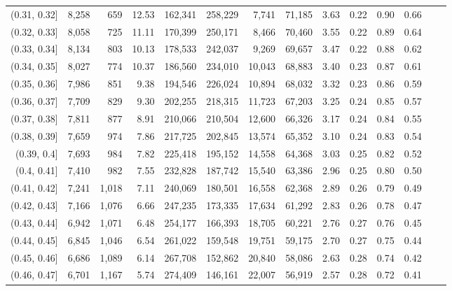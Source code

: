 \begin{tabular}{rrrrrrrrrrrrrr}
(0.31, 0.32]   &  8,258 &    659 &   12.53 &  162,341 &  258,229 &   7,741 &  71,185 &  3.63 &  0.22 &  0.90 &      0.66 \\
(0.32, 0.33]   &  8,058 &    725 &   11.11 &  170,399 &  250,171 &   8,466 &  70,460 &  3.55 &  0.22 &  0.89 &      0.64 \\
(0.33, 0.34]   &  8,134 &    803 &   10.13 &  178,533 &  242,037 &   9,269 &  69,657 &  3.47 &  0.22 &  0.88 &      0.62 \\
(0.34, 0.35]   &  8,027 &    774 &   10.37 &  186,560 &  234,010 &  10,043 &  68,883 &  3.40 &  0.23 &  0.87 &      0.61 \\
(0.35, 0.36]   &  7,986 &    851 &    9.38 &  194,546 &  226,024 &  10,894 &  68,032 &  3.32 &  0.23 &  0.86 &      0.59 \\
(0.36, 0.37]   &  7,709 &    829 &    9.30 &  202,255 &  218,315 &  11,723 &  67,203 &  3.25 &  0.24 &  0.85 &      0.57 \\
(0.37, 0.38]   &  7,811 &    877 &    8.91 &  210,066 &  210,504 &  12,600 &  66,326 &  3.17 &  0.24 &  0.84 &      0.55 \\
(0.38, 0.39]   &  7,659 &    974 &    7.86 &  217,725 &  202,845 &  13,574 &  65,352 &  3.10 &  0.24 &  0.83 &      0.54 \\
(0.39, 0.4]    &  7,693 &    984 &    7.82 &  225,418 &  195,152 &  14,558 &  64,368 &  3.03 &  0.25 &  0.82 &      0.52 \\
(0.4, 0.41]    &  7,410 &    982 &    7.55 &  232,828 &  187,742 &  15,540 &  63,386 &  2.96 &  0.25 &  0.80 &      0.50 \\
(0.41, 0.42]   &  7,241 &  1,018 &    7.11 &  240,069 &  180,501 &  16,558 &  62,368 &  2.89 &  0.26 &  0.79 &      0.49 \\
(0.42, 0.43]   &  7,166 &  1,076 &    6.66 &  247,235 &  173,335 &  17,634 &  61,292 &  2.83 &  0.26 &  0.78 &      0.47 \\
(0.43, 0.44]   &  6,942 &  1,071 &    6.48 &  254,177 &  166,393 &  18,705 &  60,221 &  2.76 &  0.27 &  0.76 &      0.45 \\
(0.44, 0.45]   &  6,845 &  1,046 &    6.54 &  261,022 &  159,548 &  19,751 &  59,175 &  2.70 &  0.27 &  0.75 &      0.44 \\
(0.45, 0.46]   &  6,686 &  1,089 &    6.14 &  267,708 &  152,862 &  20,840 &  58,086 &  2.63 &  0.28 &  0.74 &      0.42 \\
(0.46, 0.47]   &  6,701 &  1,167 &    5.74 &  274,409 &  146,161 &  22,007 &  56,919 &  2.57 &  0.28 &  0.72 &      0.41 \\

\end{tabular}
